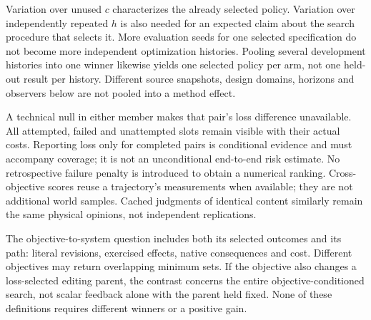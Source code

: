 Variation over unused $c$ characterizes the already selected policy. Variation
over independently repeated $h$ is also needed for an expected claim about the
search procedure that selects it. More evaluation seeds for one selected
specification do not become more independent optimization histories. Pooling
several development histories into one winner likewise yields one selected
policy per arm, not one held-out result per history. Different source snapshots,
design domains, horizons and observers below are not pooled into a method
effect.

A technical null in either member makes that pair's loss difference unavailable.
All attempted, failed and unattempted slots remain visible with their actual
costs. Reporting loss only for completed pairs is conditional evidence and
must accompany coverage; it is not an unconditional end-to-end risk estimate.
No retrospective failure penalty is introduced to obtain a numerical ranking.
Cross-objective scores reuse a trajectory's measurements when available;
they are not additional world samples. Cached judgments of identical content
similarly remain the same physical opinions, not independent replications.

The objective-to-system question includes both its selected outcomes and its
path: literal revisions, exercised effects, native consequences and cost.
Different objectives may return overlapping minimum sets. If the objective
also changes a loss-selected editing parent, the contrast concerns the entire
objective-conditioned search, not scalar feedback alone with the parent held
fixed. None of these definitions requires different winners or a positive gain.
\FloatBarrier
